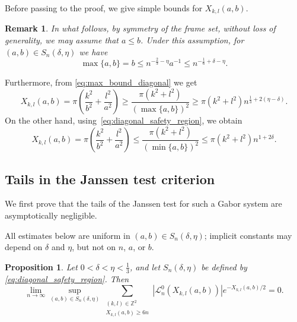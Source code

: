 \documentclass[11pt]{amsart}
\numberwithin{equation}{section}
\newtheorem{remark}[theorem]{Remark}
\newtheorem{proposition}[theorem]{Proposition}
\newcommand{\Z}{{\mathbb Z}}
\begin{document}
Before passing to the proof, we give simple bounds for $X_{k,l}(a,b).$

\begin{remark}
In what follows, by symmetry of the frame set, without loss of generality, we may assume that $a \leq b$. Under this assumption, for $(a,b) \in  S_n(\delta,\eta)$ we have 
\begin{equation}\label{eq:max_bound_diagonal}
   \max\{a,b\} = b  \leq n^{-\frac{2}{3}-\eta}a^{-1}\leq n^{-\frac{1}{6}+\delta-\eta}.
\end{equation}
\end{remark}

Furthermore, from \eqref{eq:max_bound_diagonal} we get
\begin{equation}\label{eq:Xk_lower_bound}
    X_{k,l}(a,b)=\pi\left(\frac{k^2}{b^2}+\frac{l^2}{a^2}\right) \geq  \frac{\pi(k^2 + l^2)}{(\max\{a,b\})^2} \geq \pi (k^2 + l^2) n^{\frac{1}{3}+2(\eta - \delta)}.
\end{equation}
On the other hand, using~\eqref{eq:diagonal_safety_region}, we obtain
\begin{equation}\label{eq:Xk_upper_bound}
    X_{k,l}(a,b)=\pi\left(\frac{k^2}{b^2}+\frac{l^2}{a^2}\right) \leq  \frac{\pi(k^2 + l^2)}{(\min\{a,b\})^2} \leq \pi (k^2 + l^2) n^{1+2\delta}.
\end{equation}

\subsection{Tails in the Janssen test criterion}

We first prove that the tails of the Janssen test for such a Gabor system are asymptotically negligible.

All estimates below are uniform
in $(a,b)\in S_n(\delta,\eta)$; implicit constants may depend on
$\delta$ and $\eta$, but not on $n$, $a$, or $b$.

\begin{proposition}\label{pro:Janssen_tail}
Let $0< \delta < \eta < \frac{1}{3}$, and let $S_n(\delta,\eta)$ be defined by \eqref{eq:diagonal_safety_region}. Then
    \begin{equation}\label{eq:Janssen_tail_limit}
        \lim_{n\to\infty} \sup_{(a,b)\in S_n(\delta, \eta)}
        \sum_{\substack{(k,l)\in\Z^2\\X_{k,l}(a,b)\geq6n}}
        \left|\mathcal L^0_n\left(X_{k,l}(a,b)\right)\right| e^{-X_{k,l}(a,b)/2} = 0.
    \end{equation}
\end{proposition}
\end{document}
